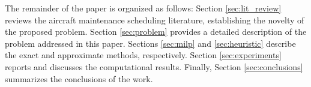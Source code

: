 The remainder of the paper is organized as follows: Section \ref{sec:lit_review} reviews the aircraft maintenance scheduling literature, establishing the novelty of the proposed problem. Section \ref{sec:problem} provides a detailed description of the problem addressed in this paper. Sections \ref{sec:milp} and \ref{sec:heuristic} describe the exact and approximate methods, respectively. Section \ref{sec:experiments} reports and discusses the computational results. Finally, Section \ref{sec:conclusions} summarizes the conclusions of the work.